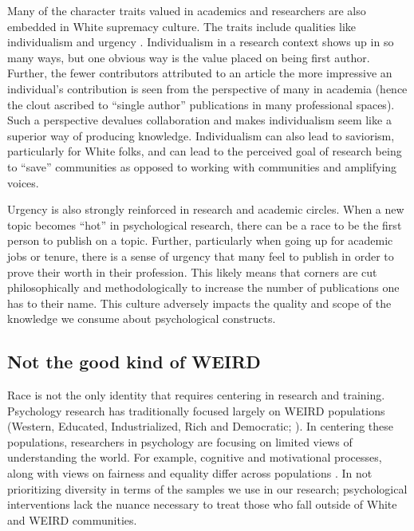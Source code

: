 \documentclass[
  11pt,
]{book}
\begin{document}
Many of the character traits valued in academics and researchers are also embedded in White supremacy culture. The traits include qualities like individualism and urgency \citep{okun_white_2021}. Individualism in a research context shows up in so many ways, but one obvious way is the value placed on being first author. Further, the fewer contributors attributed to an article the more impressive an individual's contribution is seen from the perspective of many in academia (hence the clout ascribed to ``single author'' publications in many professional spaces). Such a perspective devalues collaboration and makes individualism seem like a superior way of producing knowledge. Individualism can also lead to saviorism, particularly for White folks, and can lead to the perceived goal of research being to ``save'' communities as opposed to working with communities and amplifying voices.

Urgency is also strongly reinforced in research and academic circles. When a new topic becomes ``hot'' in psychological research, there can be a race to be the first person to publish on a topic. Further, particularly when going up for academic jobs or tenure, there is a sense of urgency that many feel to publish in order to prove their worth in their profession. This likely means that corners are cut philosophically and methodologically to increase the number of publications one has to their name. This culture adversely impacts the quality and scope of the knowledge we consume about psychological constructs.

\subsection{Not the good kind of WEIRD}\label{not-the-good-kind-of-weird}

Race is not the only identity that requires centering in research and training. Psychology research has traditionally focused largely on WEIRD populations (Western, Educated, Industrialized, Rich and Democratic; \citet{henrich_most_2010}). In centering these populations, researchers in psychology are focusing on limited views of understanding the world. For example, cognitive and motivational processes, along with views on fairness and equality differ across populations \citep{henrich_most_2010}. In not prioritizing diversity in terms of the samples we use in our research; psychological interventions lack the nuance necessary to treat those who fall outside of White and WEIRD communities.
\end{document}

